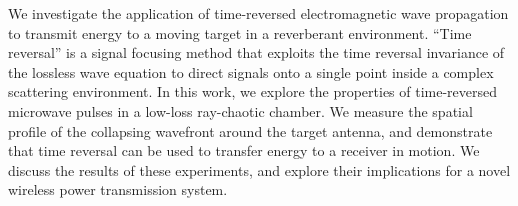 % 
% 
%
We investigate the application of time-reversed
electromagnetic wave propagation to transmit energy to a moving
target in a reverberant environment. ``Time reversal'' is a signal
focusing method that exploits the time reversal invariance of the
lossless wave equation to direct signals onto a single point inside
a complex scattering environment. In this work, we explore the
properties of time-reversed microwave pulses in a low-loss ray-chaotic
chamber. We measure the spatial profile of the collapsing
wavefront around the target antenna, and demonstrate that time
reversal can be used to transfer energy to a receiver in motion.
We discuss the results of these experiments, and explore their
implications for a novel wireless power transmission system.
